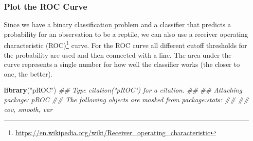 \documentclass[
  notitlepage]{book}
\newenvironment{Shaded}{\begin{snugshade}}{\end{snugshade}}
\newcommand{\CommentTok}[1]{\textcolor[rgb]{0.56,0.35,0.01}{\textit{#1}}}
\newcommand{\KeywordTok}[1]{\textcolor[rgb]{0.13,0.29,0.53}{\textbf{#1}}}
\newcommand{\NormalTok}[1]{#1}
\newcommand{\OperatorTok}[1]{\textcolor[rgb]{0.81,0.36,0.00}{\textbf{#1}}}
\newcommand{\StringTok}[1]{\textcolor[rgb]{0.31,0.60,0.02}{#1}}
\DeclareRobustCommand{\href}[2]{#2\footnote{\url{#1}}}
\begin{document}
\hypertarget{plot-the-roc-curve}{%
\subsubsection{Plot the ROC Curve}\label{plot-the-roc-curve}}

Since we have a binary classification problem and a classifier that
predicts a probability for an observation to be a reptile, we can also
use a \href{https://en.wikipedia.org/wiki/Receiver_operating_characteristic}{receiver operating characteristic
(ROC)}
curve. For the ROC curve all different cutoff thresholds for the
probability are used and then connected with a line. The area under the
curve represents a single number for how well the classifier works (the
closer to one, the better).

\begin{Shaded}
\begin{Highlighting}[]
\KeywordTok{library}\NormalTok{(}\StringTok{"pROC"}\NormalTok{)}
\CommentTok{\#\# Type \textquotesingle{}citation("pROC")\textquotesingle{} for a citation.}
\CommentTok{\#\# }
\CommentTok{\#\# Attaching package: \textquotesingle{}pROC\textquotesingle{}}
\CommentTok{\#\# The following objects are masked from \textquotesingle{}package:stats\textquotesingle{}:}
\CommentTok{\#\# }
\CommentTok{\#\#     cov, smooth, var}
\end{Highlighting}
\end{Shaded}

\begin{Shaded}
\end{Shaded}

\begin{Shaded}
\end{Shaded}
\end{document}
